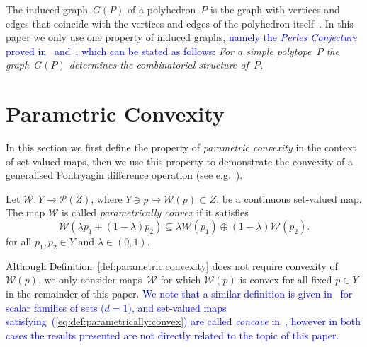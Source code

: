 \documentclass[smallextended]{svjour3}       %
\numberwithin{equation}{section}
\newcommand{\revision}[1]{\textcolor{blue}{#1}}
\begin{document}
The induced graph~$G(P)$ of a polyhedron~$P$ is the graph with vertices and edges that coincide with the vertices and edges of the polyhedron itself~\cite{Bondy:2008}.
%
In this paper we only use one property of induced graphs, 
\revision{namely the \emph{Perles Conjecture} proved in~\cite{blind87} and~\cite{Kalai:1988}, which can be stated as follows:}
\emph{For a simple polytope~$P$ the graph~$G(P)$ determines the combinatorial structure of~$P$.}

\section{Parametric Convexity}\label{sec:parametric:convexity}

In this section we first define the property of \emph{parametric convexity} in the context of set-valued maps,
%
then we use this property to demonstrate the convexity of a generalised Pontryagin difference operation (see e.g.~\cite{Hadwiger:1950,blanchini:2007}). 
%
%
\begin{definition}\label{def:parametric:convexity}
Let $\mathcal W:Y\rightarrow \mathscr P(Z)$, where $Y\ni p\mapsto \mathcal W(p) \subset Z$, be a continuous set-valued map. The map $\mathcal W$ is called \emph{parametrically convex} if it satisfies
%
  \begin{equation}\label{eq:def:parametrically:convex}
  \mathcal W(\lambda p_1 + (1-\lambda)p_2)\subseteq\lambda \mathcal W(p_1) \oplus (1-\lambda) \mathcal W(p_2).
\end{equation}
for all $p_1,p_2\in Y$ and $\lambda\in (0,1)$.
\end{definition}
%
Although Definition~\ref{def:parametric:convexity} does not require convexity of~$\mathcal W(p)$, we only consider maps~$\mathcal W$ for which $\mathcal W(p)$ is convex for all fixed $p\in Y$ in the remainder of this paper.
%
\revision{We note that a similar definition is given in~\cite{Hadwiger:1957} for scalar families of sets ($d=1$), and set-valued maps satisfying~(\ref{eq:def:parametrically:convex}) are called \emph{concave} in~\cite{wasowicz16}, however in both cases the results presented are not directly related to the topic of this paper.}
\end{document}
